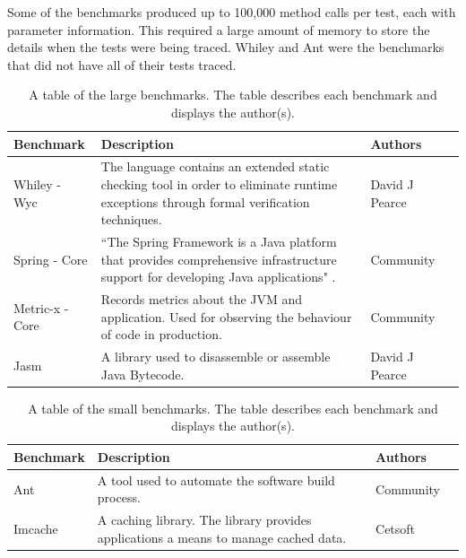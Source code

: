 \documentclass[11pt
              , a4paper
              , twoside
              , openright
              ]{report}
\begin{document}
Some of the benchmarks produced up to 100,000 method calls per test, each with parameter information. This required a large amount of memory to store the details when the tests were being traced. Whiley and Ant were the benchmarks that did not have all of their tests traced. 

\begin{table}[H]
\centering
\begin{tabular}{|l|l|l|l|}
\hline
{\bf Benchmark}       &  {\bf Description}  & {\bf Authors}   \\ \hline
Whiley - Wyc         &     \begin{minipage}[t]{0.6\columnwidth} The language contains an extended static checking tool in order to eliminate runtime exceptions through formal verification techniques. 
\end{minipage}     & David J Pearce          \\ \hline
Spring - Core   &  \begin{minipage}[t]{0.6\columnwidth} ``The Spring Framework is a Java platform that provides comprehensive infrastructure support for developing Java applications" \cite{spring} .
\end{minipage}       & Community \\ \hline
Metric-x - Core &     \begin{minipage}[t]{0.6\columnwidth} Records metrics about the JVM and application. Used for observing the behaviour of code in production.
\end{minipage}        & Community \\ \hline
Jasm              &     \begin{minipage}[t]{0.6\columnwidth} A library used to disassemble or assemble Java Bytecode. 
\end{minipage}          & David J Pearce \\ \hline

\end{tabular}
\caption{A table of the large benchmarks. The table describes each benchmark and displays the author(s).}
\label{large_testdes}
\end{table}

\begin{table}[H]
\centering
\begin{tabular}{|l|l|l|l|}
\hline
{\bf Benchmark}   & {\bf Description}  & {\bf Authors}  \\ \hline
Ant             &    \begin{minipage}[t]{0.6\columnwidth} A tool used to automate the software build process. 
\end{minipage}  & Community \\ \hline
Imcache &      \begin{minipage}[t]{0.6\columnwidth} A caching library. The library provides applications a means to manage cached data. 
\end{minipage}     & Cetsoft \\ \hline
\end{tabular}
\caption{A table of the small benchmarks. The table describes each benchmark and displays the author(s).}
\label{small_testdes}
\end{table}
\end{document}
